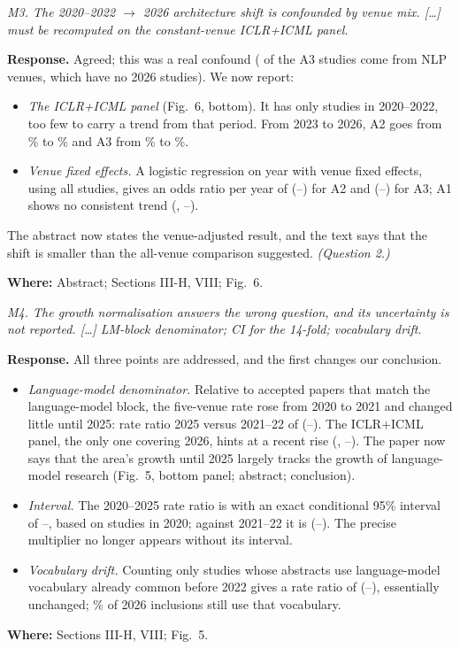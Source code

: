 \documentclass[10pt,a4paper]{article}
\newenvironment{referee}{\par\medskip\noindent\begin{minipage}{\linewidth}\color{black!65}\itshape}{\end{minipage}\par\smallskip}
\newcommand{\resp}{\noindent\textbf{Response.} }
\newcommand{\where}[1]{\par\noindent\textbf{Where:} #1\par}
\begin{document}
\begin{referee}M3. The 2020--2022 $\rightarrow$ 2026 architecture shift is confounded by venue mix. [\ldots] must be recomputed on the constant-venue ICLR+ICML panel.\end{referee}
\resp Agreed; this was a real confound ( of the  A3 studies come from NLP venues, which have no 2026 studies). We now report:
\begin{itemize}
  \item \emph{The ICLR+ICML panel} (Fig.~6, bottom). It has only  studies in 2020--2022, too few to carry a trend from that period. From 2023 to 2026, A2 goes from \% to \% and A3 from \% to \%.
  \item \emph{Venue fixed effects.} A logistic regression on year with venue fixed effects, using all studies, gives an odds ratio per year of  (--) for A2 and  (--) for A3; A1 shows no consistent trend (, --).
\end{itemize}
The abstract now states the venue-adjusted result, and the text says that the shift is smaller than the all-venue comparison suggested. \emph{(Question 2.)}
\where{Abstract; Sections III-H, VIII; Fig.~6.}

\begin{referee}M4. The growth normalisation answers the wrong question, and its uncertainty is not reported. [\ldots] LM-block denominator; CI for the 14-fold; vocabulary drift.\end{referee}
\resp All three points are addressed, and the first changes our conclusion.
\begin{itemize}
  \item \emph{Language-model denominator.} Relative to accepted papers that match the language-model block, the five-venue rate rose from 2020 to 2021 and changed little until 2025: rate ratio 2025 versus 2021--22 of  (--). The ICLR+ICML panel, the only one covering 2026, hints at a recent rise (, --). The paper now says that the area's growth until 2025 largely tracks the growth of language-model research (Fig.~5, bottom panel; abstract; conclusion).
  \item \emph{Interval.} The 2020--2025 rate ratio is  with an exact conditional 95\% interval of --, based on  studies in 2020; against 2021--22 it is  (--). The precise multiplier no longer appears without its interval.
  \item \emph{Vocabulary drift.} Counting only studies whose abstracts use language-model vocabulary already common before 2022 gives a rate ratio of  (--), essentially unchanged; \% of 2026 inclusions still use that vocabulary.
\end{itemize}
\where{Sections III-H, VIII; Fig.~5.}
\end{document}
